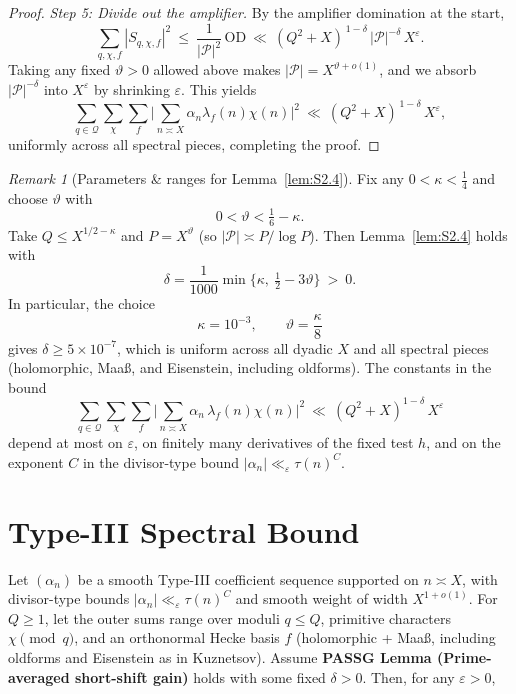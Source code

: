 \documentclass[11pt]{article}
\theoremstyle{definition}
\theoremstyle{remark}
\newtheorem{remark}[lemma]{Remark}
\numberwithin{equation}{part}
\begin{document}
\begin{proof}
	\emph{Step 5: Divide out the amplifier.}
	By the amplifier domination at the start,
	\[
		\sum_{q,\chi,f} |S_{q,\chi,f}|^2 \ \le\ \frac{1}{|\mathcal P|^2}\,\mathrm{OD}
		\ \ll\ (Q^2+X)^{\,1-\delta}\,|\mathcal P|^{-\delta}\,X^\varepsilon.
	\]
	Taking any fixed $\vartheta>0$ allowed above makes $|\mathcal P|=X^{\vartheta+o(1)}$, and we absorb $|\mathcal P|^{-\delta}$ into $X^\varepsilon$ by shrinking $\varepsilon$. This yields
	\[
		\sum_{q\in\mathcal Q}\sum_{\chi}\sum_f \Big|\sum_{n\asymp X}\alpha_n\lambda_f(n)\chi(n)\Big|^2
		\ \ll\ (Q^2+X)^{\,1-\delta}\,X^\varepsilon,
	\]
	uniformly across all spectral pieces, completing the proof.
\end{proof}

\begin{remark}[Parameters \& ranges for Lemma~\ref{lem:S2.4}]
	Fix any $0<\kappa<\tfrac14$ and choose $\vartheta$ with
	\[
		0<\vartheta<\tfrac16-\kappa .
	\]
	Take $Q\le X^{1/2-\kappa}$ and $P=X^\vartheta$ (so $|\mathcal P|\asymp P/\log P$).
	Then Lemma~\ref{lem:S2.4} holds with
	\[
		\delta=\frac{1}{1000}\min\!\Big\{\kappa,\ \tfrac12-3\vartheta\Big\}\ >\ 0 .
	\]
	In particular, the choice
	\[
		\kappa=10^{-3},\qquad \vartheta=\frac{\kappa}{8}
	\]
	gives $\delta\ge 5\times 10^{-7}$, which is uniform across all dyadic $X$ and all spectral pieces (holomorphic, Maa\ss, and Eisenstein, including oldforms). The constants in the bound
	\[
		\sum_{q\in\mathcal Q}\sum_{\chi}\sum_f \Big|\sum_{n\asymp X}\alpha_n\,\lambda_f(n)\chi(n)\Big|^2
		\ \ll\ (Q^2+X)^{1-\delta}\,X^\varepsilon
	\]
	depend at most on $\varepsilon$, on finitely many derivatives of the fixed test $h$, and on the exponent $C$ in the divisor-type bound $|\alpha_n|\ll_\varepsilon \tau(n)^C$.
\end{remark}


\section{Type-III Spectral Bound}

\noindent Let $(\alpha_n)$ be a smooth Type-III coefficient sequence supported on $n\asymp X$, with divisor-type bounds $|\alpha_n|\ll_\varepsilon \tau(n)^C$ and smooth weight of width $X^{1+o(1)}$. For $Q\ge 1$, let the outer sums range over moduli $q\le Q$, primitive characters $\chi\pmod q$, and an orthonormal Hecke basis $f$ (holomorphic + Maa\ss, including oldforms and Eisenstein as in Kuznetsov). Assume \textbf{PASSG Lemma (Prime-averaged short-shift gain)} holds with some fixed $\delta>0$. Then, for any $\varepsilon>0$,
\end{document}
